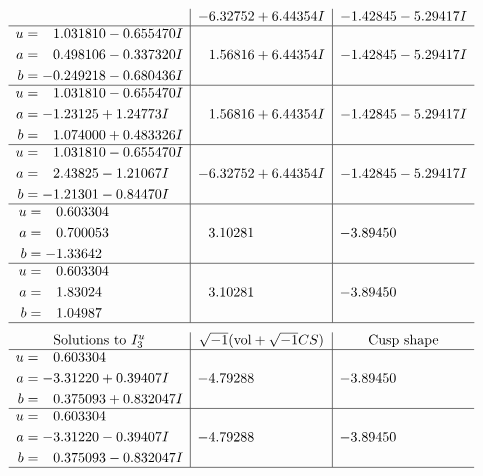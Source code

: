 \documentclass[1p]{elsarticle_modified}
\theoremstyle{definition}
\newcommand{\I}{\sqrt{-1}}
\begin{document}
$$\begin{array}{c|c|c}
 & -6.32752 + 6.44354 I & -1.42845 - 5.29417 I \\ \hline\begin{aligned}
u &= \phantom{-}1.031810 - 0.655470 I \\
a &= \phantom{-}0.498106 - 0.337320 I \\
b &= -0.249218 - 0.680436 I\end{aligned}
 & \phantom{-}1.56816 + 6.44354 I & -1.42845 - 5.29417 I \\ \hline\begin{aligned}
u &= \phantom{-}1.031810 - 0.655470 I \\
a &= -1.23125 + 1.24773 I \\
b &= \phantom{-}1.074000 + 0.483326 I\end{aligned}
 & \phantom{-}1.56816 + 6.44354 I & -1.42845 - 5.29417 I \\ \hline\begin{aligned}
u &= \phantom{-}1.031810 - 0.655470 I \\
a &= \phantom{-}2.43825 - 1.21067 I \\
b &= -1.21301 - 0.84470 I\end{aligned}
 & -6.32752 + 6.44354 I & -1.42845 - 5.29417 I \\ \hline\begin{aligned}
u &= \phantom{-}0.603304\phantom{ +0.000000I} \\
a &= \phantom{-}0.700053\phantom{ +0.000000I} \\
b &= -1.33642\phantom{ +0.000000I}\end{aligned}
 & \phantom{-}3.10281\phantom{ +0.000000I} & -3.89450\phantom{ +0.000000I} \\ \hline\begin{aligned}
u &= \phantom{-}0.603304\phantom{ +0.000000I} \\
a &= \phantom{-}1.83024\phantom{ +0.000000I} \\
b &= \phantom{-}1.04987\phantom{ +0.000000I}\end{aligned}
 & \phantom{-}3.10281\phantom{ +0.000000I} & -3.89450\phantom{ +0.000000I}\\
 \hline 
 \end{array}$$\newpage$$\begin{array}{c|c|c}  
\text{Solutions to }I^u_{3}& \I (\text{vol} + \sqrt{-1}CS) & \text{Cusp shape}\\
 \hline 
\begin{aligned}
u &= \phantom{-}0.603304\phantom{ +0.000000I} \\
a &= -3.31220 + 0.39407 I \\
b &= \phantom{-}0.375093 + 0.832047 I\end{aligned}
 & -4.79288\phantom{ +0.000000I} & -3.89450\phantom{ +0.000000I} \\ \hline\begin{aligned}
u &= \phantom{-}0.603304\phantom{ +0.000000I} \\
a &= -3.31220 - 0.39407 I \\
b &= \phantom{-}0.375093 - 0.832047 I\end{aligned}
 & -4.79288\phantom{ +0.000000I} & -3.89450\phantom{ +0.000000I}\\
 \hline 
 \end{array}$$\newpage
\end{document}
